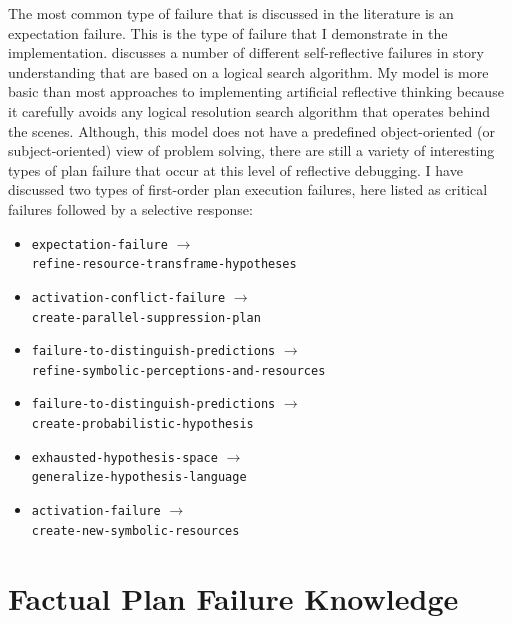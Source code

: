 The most common type of failure that is discussed in the literature is
an expectation failure.  This is the type of failure that I
demonstrate in the implementation.  \cite{cox:2007a} discusses a
number of different self-reflective failures in story understanding
that are based on a logical search algorithm.  My model is more basic
than most approaches to implementing artificial reflective thinking
because it carefully avoids any logical resolution search algorithm
that operates behind the scenes.  Although, this model does not have a
predefined object-oriented (or subject-oriented) view of problem
solving, there are still a variety of interesting types of plan
failure that occur at this level of reflective debugging.  I have
discussed two types of first-order plan execution failures, here
listed as critical failures followed by a selective response:
\begin{itemize}
\item {\tt expectation-failure} $\longrightarrow$ \\
      {\tt refine-resource-transframe-hypotheses}
\item {\tt activation-conflict-failure} $\longrightarrow$ \\
      {\tt create-parallel-suppression-plan}
\item {\tt failure-to-distinguish-predictions} $\longrightarrow$ \\
      {\tt refine-symbolic-perceptions-and-resources}
\item {\tt failure-to-distinguish-predictions} $\longrightarrow$ \\
      {\tt create-probabilistic-hypothesis}
\item {\tt exhausted-hypothesis-space} $\longrightarrow$ \\
      {\tt generalize-hypothesis-language}
\item {\tt activation-failure} $\longrightarrow$ \\
      {\tt create-new-symbolic-resources}
\end{itemize}

\section{Factual Plan Failure Knowledge}

